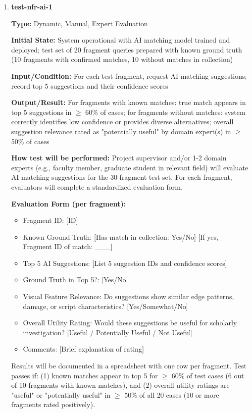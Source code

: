 \documentclass[12pt, titlepage]{article}
\begin{document}
\begin{enumerate}

\item \textbf{test-nfr-ai-1}

\textbf{Type:} Dynamic, Manual, Expert Evaluation

\textbf{Initial State:} System operational with AI matching model trained and deployed; test set of 20 fragment queries prepared with known ground truth (10 fragments with confirmed matches, 10 without matches in collection)

\textbf{Input/Condition:} For each test fragment, request AI matching suggestions; record top 5 suggestions and their confidence scores

\textbf{Output/Result:} For fragments with known matches: true match appears in top 5 suggestions in $\geq$ 60\% of cases; for fragments without matches: system correctly identifies low confidence or provides diverse alternatives; overall suggestion relevance rated as "potentially useful" by domain expert(s) in $\geq$ 50\% of cases

\textbf{How test will be performed:} Project supervisor and/or 1-2 domain experts (e.g., faculty member, graduate student in relevant field) will evaluate AI matching suggestions for the 30-fragment test set. For each fragment, evaluators will complete a standardized evaluation form.

\textbf{Evaluation Form (per fragment):}
\begin{itemize}
\item Fragment ID: [ID]
\item Known Ground Truth: [Has match in collection: Yes/No] [If yes, Fragment ID of match: \_\_\_]
\item Top 5 AI Suggestions: [List 5 suggestion IDs and confidence scores]
\item Ground Truth in Top 5?: [Yes/No]
\item Visual Feature Relevance: Do suggestions show similar edge patterns, damage, or script characteristics? [Yes/Somewhat/No]
\item Overall Utility Rating: Would these suggestions be useful for scholarly investigation? [Useful / Potentially Useful / Not Useful]
\item Comments: [Brief explanation of rating]
\end{itemize}

Results will be documented in a spreadsheet with one row per fragment. Test passes if: (1) known matches appear in top 5 for $\geq$ 60\% of test cases (6 out of 10 fragments with known matches), and (2) overall utility ratings are "useful" or "potentially useful" in $\geq$ 50\% of all 20 cases (10 or more fragments rated positively).

\end{enumerate}
\end{document}
